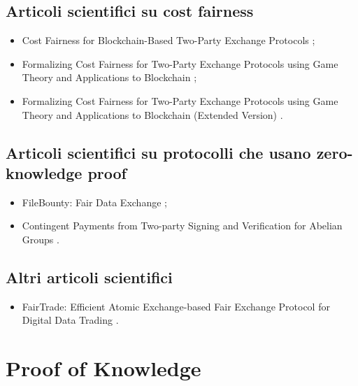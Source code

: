 \subsection*{Articoli scientifici su cost fairness}
\begin{itemize}

\item Cost Fairness for Blockchain-Based Two-Party Exchange Protocols \cite{lhor2020costfairness};

\item Formalizing Cost Fairness for Two-Party Exchange Protocols using Game Theory and Applications to Blockchain \cite{lhor2022costfairness};

\item Formalizing Cost Fairness for Two-Party Exchange Protocols using Game Theory and Applications to Blockchain (Extended Version) \cite{lhor2022costfairnessext}.

\end{itemize}

\subsection*{Articoli scientifici su protocolli che usano zero-knowledge proof}
\begin{itemize}

\item FileBounty: Fair Data Exchange \cite{janin2020fairdata};

\item Contingent Payments from Two-party Signing and Verification for Abelian Groups \cite{bursuc2022fairabelian}.

\end{itemize}

\subsection*{Altri articoli scientifici}
\begin{itemize}

\item FairTrade: Efficient Atomic Exchange-based Fair Exchange Protocol for Digital Data Trading \cite{chenli2021fairtrade}.

\end{itemize}

\section*{Proof of Knowledge}

